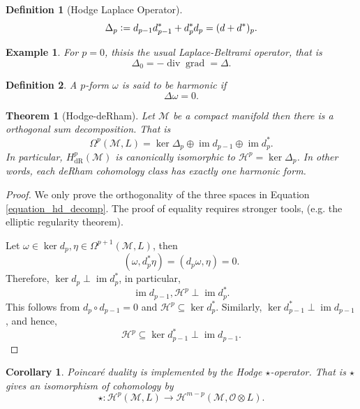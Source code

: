 \documentclass[8pt]{article}
\newtheorem{theorem}{Theorem} [section]
\newtheorem{definition}{Definition}[section]
\newtheorem{corollary}{Corollary} [section]
\newtheorem{example}{Example}[section]
\DeclareMathOperator{\grad}{grad}
\DeclareMathOperator{\diverg}{div}
\DeclareMathOperator{\image}{im}
\DeclareMathOperator{\dR}{dR}
\newcommand{\defeq}{\vcentcolon=}
\newcommand{\M}[0]{\mathcal{M}}
\begin{document}
\begin{definition}[Hodge Laplace Operator]
  \begin{equation*}
    \Delta_p\defeq d_{p-1}d_{p-1}^*+d_p^*d_p = (d+d^*)_p.
  \end{equation*}
\end{definition}
\begin{example}
  For $p=0$, thisis the usual Laplace-Beltrami operator, that is 
  \begin{equation*}
  \Delta_0=-\diverg\grad = \Delta.
  \end{equation*}
\end{example}
\begin{definition}
  A $p$-form $\omega$ is said to be harmonic if 
  \begin{equation*}
  \Delta\omega=0.
  \end{equation*}
\end{definition}
\begin{theorem}[Hodge-deRham]
  Let $\M$ be a compact manifold then there is a orthogonal sum decomposition. That is 
  \begin{equation*}
  \Omega^p(\M,L) = \ker\Delta_p\oplus\image d_{p-1}\oplus \image d_p^*. \tag{HD}\label{equation_hd_decomp}
  \end{equation*}
  In particular, $H^p_{\dR}(\M)$ is canonically isomorphic to $\mathscr{H}^p=\ker\Delta_p$. In other words, each deRham cohomology class has exactly one harmonic form.
\end{theorem}
\begin{proof}
  We only prove the orthogonality of the three spaces in Equation \eqref{equation_hd_decomp}. The proof of equality requires stronger tools, (e.g. the elliptic regularity theorem).
  \par Let $\omega\in\ker d_p,\eta\in\Omega^{p+1}(\M,L)$, then 
  \begin{equation*}
    (\omega,d_p^*\eta)=(d_p\omega,\eta) = 0.
  \end{equation*}
  Therefore, $\ker d_p\perp\image d_p^*$, in particular, 
  \begin{equation*}
    \image d_{p-1},\mathscr{H}^p\perp\image d_p^*.
  \end{equation*}
  This follows from $d_p\circ d_{p-1}=0$ and $\mathscr{H}^p\subseteq \ker d_p^*$. Similarly, $\ker d_{p-1}^*\perp\image d_{p-1}$, and hence,
  \begin{equation*}
    \mathscr{H}^p\subseteq\ker d_{p-1}^*\perp\image d_{p-1}.
  \end{equation*}
\end{proof}
\begin{corollary}
  Poincaré duality is implemented by the Hodge $\star$-operator. That is $\star$ gives an isomorphism of cohomology by
  \begin{equation*}
    \star:\mathscr{H}^p(\M,L)\to\mathscr{H}^{m-p}(\M,\mathcal{O}\otimes L).
  \end{equation*}
\end{corollary}
\end{document}

